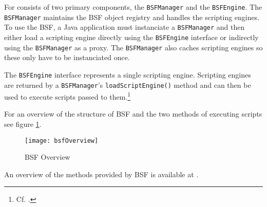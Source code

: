 For consists of two primary components, the \texttt{BSFManager} and the \texttt{BSFEngine}. The \texttt{BSFManager} maintains the BSF object registry and handles the scripting engines. To use the BSF, a Java application must instanciate a \texttt{BSFManager} and then either load a scripting engine directly using the \texttt{BSFEngine} interface or indirectly using the \texttt{BSFManager} as a proxy. The \texttt{BSFManager} also caches scripting engines so these only have to be instanciated once.

The \texttt{BSFEngine} interface represents a single scripting engine. Scripting engines are returned by a \texttt{BSFManager}'s \texttt{loadScriptEngine()} method and can then be used to execute scripts passed to them.\footnote{Cf. \cite{BsfManual}.}

For an overview of the structure of BSF and the two methods of executing scripts see figure \ref{fig:bsfOverview}.

\begin{figure}
	\centering
		\texttt{[image: bsfOverview]}
	\caption{BSF Overview}
	\label{fig:bsfOverview}
\end{figure}

An overview of the methods provided by BSF is available at \cite{BsfManual}.

